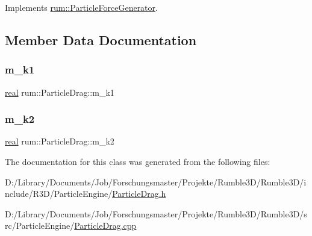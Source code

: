 Implements \mbox{\hyperlink{classrum_1_1_particle_force_generator_af7abcafb9527220988ec4b9dde817b34}{rum\+::\+Particle\+Force\+Generator}}.



\subsection{Member Data Documentation}
\mbox{\label{classrum_1_1_particle_drag_ad4fcf721667ea70b2ee8ca5ddac9d0ed}} 
\subsubsection{\texorpdfstring{m\+\_\+k1}{m\_k1}}
{\footnotesize\ttfamily \mbox{\hyperlink{namespacerum_a7e8cca23573d5eaead0f138cbaa4862c}{real}} rum\+::\+Particle\+Drag\+::m\+\_\+k1\hspace{0.3cm}{\ttfamily [protected]}}

\mbox{\label{classrum_1_1_particle_drag_a30f863703e55b68316c64c6f9a8cc25f}} 
\subsubsection{\texorpdfstring{m\+\_\+k2}{m\_k2}}
{\footnotesize\ttfamily \mbox{\hyperlink{namespacerum_a7e8cca23573d5eaead0f138cbaa4862c}{real}} rum\+::\+Particle\+Drag\+::m\+\_\+k2\hspace{0.3cm}{\ttfamily [protected]}}



The documentation for this class was generated from the following files\+:\begin{DoxyCompactItemize}
\item 
D\+:/\+Library/\+Documents/\+Job/\+Forschungsmaster/\+Projekte/\+Rumble3\+D/\+Rumble3\+D/include/\+R3\+D/\+Particle\+Engine/\mbox{\hyperlink{_particle_drag_8h}{Particle\+Drag.\+h}}\item 
D\+:/\+Library/\+Documents/\+Job/\+Forschungsmaster/\+Projekte/\+Rumble3\+D/\+Rumble3\+D/src/\+Particle\+Engine/\mbox{\hyperlink{_particle_drag_8cpp}{Particle\+Drag.\+cpp}}\end{DoxyCompactItemize}
